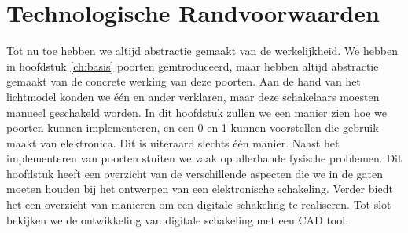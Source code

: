 \chapter{Technologische Randvoorwaarden}
\begin{chapterintro}
Tot nu toe hebben we altijd abstractie gemaakt van de werkelijkheid. We hebben in hoofdstuk \ref{ch:basis} poorten ge\"introduceerd, maar hebben altijd abstractie gemaakt van de concrete werking van deze poorten. Aan de hand van het lichtmodel konden we \'e\'en en ander verklaren, maar deze schakelaars moesten manueel geschakeld worden. In dit hoofdstuk zullen we een manier zien hoe we poorten kunnen implementeren, en een 0 en 1 kunnen voorstellen die gebruik maakt van elektronica. Dit is uiteraard slechts \'e\'en manier. Naast het implementeren van poorten stuiten we vaak op allerhande fysische problemen. Dit hoofdstuk heeft een overzicht van de verschillende aspecten die we in de gaten moeten houden bij het ontwerpen van een elektronische schakeling. Verder biedt het een overzicht van manieren om een digitale schakeling te realiseren. Tot slot bekijken we de ontwikkeling van digitale schakeling met een CAD tool.
\end{chapterintro}
\minitoc[n]
